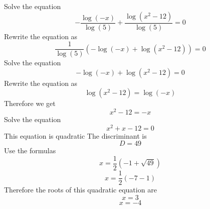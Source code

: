 \documentclass[12pt,fleqn]{article}
\begin{document}
Solve the equation
$$- \frac{\log{\left (- x \right )}}{\log{\left (5 \right )}} + \frac{\log{\left (x^{2} - 12 \right )}}{\log{\left (5 \right )}} = 0$$
Rewrite the equation as
$$\frac{1}{\log{\left (5 \right )}} \left(- \log{\left (- x \right )} + \log{\left (x^{2} - 12 \right )}\right) = 0$$
Solve the equation
$$- \log{\left (- x \right )} + \log{\left (x^{2} - 12 \right )} = 0$$
Rewrite the equation as
$$\log{\left (x^{2} - 12 \right )} = \log{\left (- x \right )}$$
Therefore we get
$$x^{2} - 12 = - x$$
Solve the equation
$$x^{2} + x - 12 = 0$$
This equation is quadratic
The discriminant is
$$D = 49$$
Use the formulas
$$x = \frac{1}{2} \left(-1 + \sqrt{49}\right)$$
$$x = \frac{1}{2} \left(- 7 - 1\right)$$
Therefore the roots of this quadratic equation are
$$x = 3$$
$$x = -4$$
\end{document}
